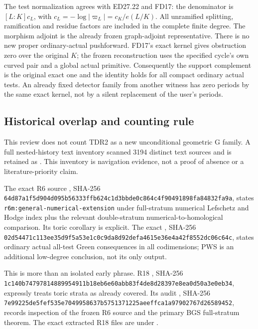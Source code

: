 The test normalization agrees with ED27.22 and FD17:
the denominator is $[L:K]c_L$, with
$c_L=-\log|\varpi_L|=c_K/e(L/K)$. All unramified splitting,
ramification and residue factors are included in the complete finite
degree. The morphism adjoint is the already frozen graph-adjoint
representative. There is no new proper ordinary-actual pushforward.
FD17's exact kernel gives obstruction zero over the original $K$;
the frozen reconstruction uses the specified cycle's own curved pair
and a global actual primitive. Consequently the support complement
is the original exact one and the identity holds for all compact
ordinary actual tests. An already fixed detector family from another
witness has zero periods by the same exact kernel, not by a silent
replacement of the user's periods.

\subsection{Historical overlap and counting rule}

This review does not count TDR2 as a new unconditional geometric
G family. A full nested-history text inventory scanned 3194 distinct
text sources and is retained as
.
This inventory is navigation evidence, not a proof of absence or a
literature-priority claim.

The exact R6 source
, SHA-256
\texttt{64d87a1f5d904d095b56333ffb624c1d3bbde0c864c4f90491898fa84832fa9a},
states \texttt{r6m:general-numerical-extension} under full-stratum
numerical Lefschetz and Hodge index plus the relevant double-stratum
numerical-to-homological comparison. Its toric corollary is explicit.
The exact
, SHA-256
\texttt{02d54471c113ee35d9f5a53e1c0c9da8d92defa4615e36e4a42f8552dc06c64c},
states ordinary actual all-test Green consequences in all codimensions;
PWS is an additional low-degree conclusion, not its only output.

This is more than an isolated early phrase. R18
, SHA-256
\texttt{1c140b74797814889954911b18eb6e60abb83f4de8d28397e8ea0d50a3e0eb34},
expressly treats toric strata as already covered. Its audit
, SHA-256
\texttt{7e99225de5fef535e7049958637b5751371225aeeffca1a97902767d26589452},
records inspection of the frozen R6 source and the primary BGS
full-stratum theorem. The exact extracted R18 files are under
.


